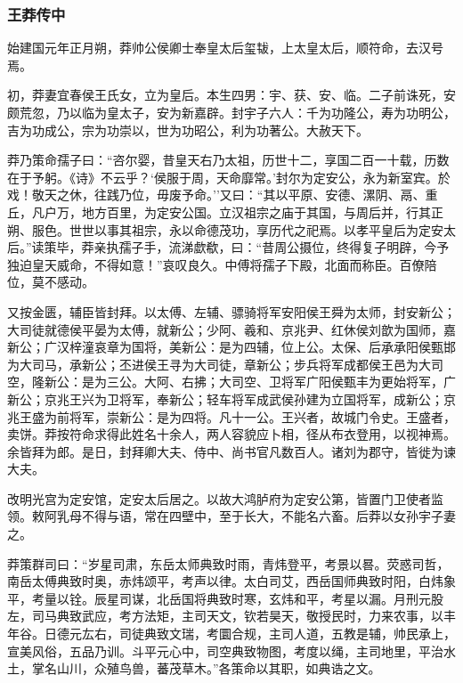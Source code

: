 \documentclass[]{article}
\begin{document}
\hypertarget{header-n6812}{%
\subsubsection{王莽传中}\label{header-n6812}}

始建国元年正月朔，莽帅公侯卿士奉皇太后玺韨，上太皇太后，顺符命，去汉号焉。

初，莽妻宜春侯王氏女，立为皇后。本生四男：宇、获、安、临。二子前诛死，安颇荒忽，乃以临为皇太子，安为新嘉辟。封宇子六人：千为功隆公，寿为功明公，吉为功成公，宗为功崇以，世为功昭公，利为功著公。大赦天下。

莽乃策命孺子曰：``咨尔婴，昔皇天右乃太祖，历世十二，享国二百一十载，历数在于予躬。《诗》不云乎？`侯服于周，天命靡常。'封尔为定安公，永为新室宾。於戏！敬天之休，往践乃位，毋废予命。''又曰：``其以平原、安德、漯阴、鬲、重丘，凡户万，地方百里，为定安公国。立汉祖宗之庙于其国，与周后并，行其正朔、服色。世世以事其祖宗，永以命德茂功，享历代之祀焉。以孝平皇后为定安太后。''读策毕，莽亲执孺子手，流涕歔欷，曰：``昔周公摄位，终得复子明辟，今予独迫皇天威命，不得如意！''哀叹良久。中傅将孺子下殿，北面而称臣。百僚陪位，莫不感动。

又按金匮，辅臣皆封拜。以太傅、左辅、骠骑将军安阳侯王舜为太师，封安新公；大司徒就德侯平晏为太傅，就新公；少阿、羲和、京兆尹、红休侯刘歆为国师，嘉新公；广汉梓潼哀章为国将，美新公：是为四辅，位上公。太保、后承承阳侯甄邯为大司马，承新公；丕进侯王寻为大司徒，章新公；步兵将军成都侯王邑为大司空，隆新公：是为三公。大阿、右拂；大司空、卫将军广阳侯甄丰为更始将军，广新公；京兆王兴为卫将军，奉新公；轻车将军成武侯孙建为立国将军，成新公；京兆王盛为前将军，崇新公：是为四将。凡十一公。王兴者，故城门令史。王盛者，卖饼。莽按符命求得此姓名十余人，两人容貌应卜相，径从布衣登用，以视神焉。余皆拜为郎。是日，封拜卿大夫、侍中、尚书官凡数百人。诸刘为郡守，皆徙为谏大夫。

改明光宫为定安馆，定安太后居之。以故大鸿胪府为定安公第，皆置门卫使者监领。敕阿乳母不得与语，常在四壁中，至于长大，不能名六畜。后莽以女孙宇子妻之。

莽策群司曰：``岁星司肃，东岳太师典致时雨，青炜登平，考景以晷。荧惑司哲，南岳太傅典致时奥，赤炜颂平，考声以律。太白司艾，西岳国师典致时阳，白炜象平，考量以铨。辰星司谋，北岳国将典致时寒，玄炜和平，考星以漏。月刑元股左，司马典致武应，考方法矩，主司天文，钦若昊天，敬授民时，力来农事，以丰年谷。日德元厷右，司徒典致文瑞，考圜合规，主司人道，五教是辅，帅民承上，宣美风俗，五品乃训。斗平元心中，司空典致物图，考度以绳，主司地里，平治水土，掌名山川，众殖鸟兽，蕃茂草木。''各策命以其职，如典诰之文。
\end{document}
